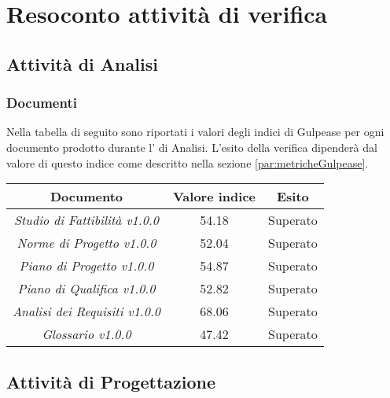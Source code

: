 \documentclass{scalatekids-article}
\begin{document}
\section{Resoconto attività di verifica}
\label{sec:resAttivitaVerifica}

\subsection{Attività di Analisi}

\subsubsection{Documenti}
Nella tabella di seguito sono riportati i valori degli indici di Gulpease per ogni documento prodotto durante l' di Analisi. L'esito della verifica dipenderà dal valore di questo indice come descritto nella sezione \ref{par:metricheGulpease}.
\begin{center}
  \begin{tabular}{| c | c | c |}
    \hline
    Documento & Valore indice & Esito\\
    \hline
    \textit{Studio di Fattibilità v1.0.0} & 54.18 & Superato\\
    \textit{Norme di Progetto v1.0.0} & 52.04 & Superato\\
    \textit{Piano di Progetto v1.0.0} & 54.87 & Superato\\
    \textit{Piano di Qualifica v1.0.0} & 52.82 & Superato\\
    \textit{Analisi dei Requisiti v1.0.0} & 68.06 & Superato\\
    \textit{Glossario v1.0.0} & 47.42 & Superato\\
    \hline
  \end{tabular}
\end{center}

\subsection{Attività di Progettazione}
\end{document}
